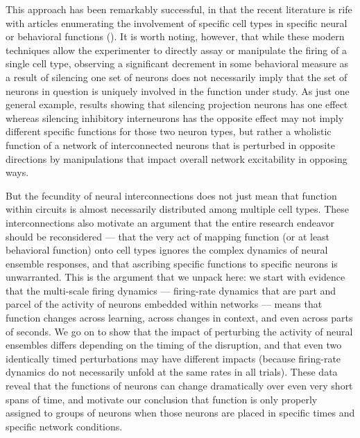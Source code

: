 \begin{refsection}
This approach has been remarkably successful, in that the recent literature is rife with articles enumerating the involvement of specific cell types in specific neural or behavioral functions (\cite{adamantidis2015a,balthazart2020a,biselli2019a,janak2015a,tye2012a}). It is worth noting, however, that while these modern techniques allow the experimenter to directly assay or manipulate the firing of a single cell type, observing a significant decrement in some behavioral measure as a result of silencing one set of neurons does not necessarily imply that the set of neurons in question is uniquely involved in the function under study. As just one general example, results showing that silencing projection neurons has one effect whereas silencing inhibitory interneurons has the opposite effect may not imply different specific functions for those two neuron types, but rather a wholistic function of a network of interconnected neurons that is perturbed in opposite directions by manipulations that impact overall network excitability in opposing ways.

But the fecundity of neural interconnections does not just mean that function within circuits is almost necessarily distributed among multiple cell types. These interconnections also motivate an argument that the entire research endeavor should be reconsidered --- that the very act of mapping function (or at least behavioral function) onto cell types ignores the complex dynamics of neural ensemble responses, and that ascribing specific functions to specific neurons is unwarranted. This is the argument that we unpack here: we start with evidence that the multi-scale firing dynamics --- firing-rate dynamics that are part and parcel of the activity of neurons embedded within networks --- means that function changes across learning, across changes in context, and even across parts of seconds. We go on to show that the impact of perturbing the activity of neural ensembles differs depending on the timing of the disruption, and that even two identically timed perturbations may have different impacts (because firing-rate dynamics do not necessarily unfold at the same rates in all trials). These data reveal that the functions of neurons can change dramatically over even very short spans of time, and motivate our conclusion that function is only properly assigned to groups of neurons when those neurons are placed in specific times and specific network conditions.


\end{refsection}
